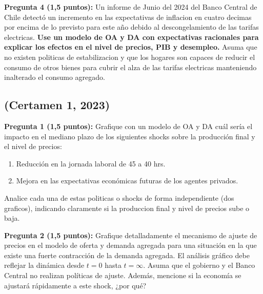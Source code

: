 \documentclass[11pt,addpoints]{article}
\begin{document}
\textbf{Pregunta 4 (1,5 puntos):}  
Un informe de Junio del 2024 del Banco Central de Chile detectó un incremento en las expectativas de inflacion en cuatro decimas por encima de lo previsto para este año debido al descongelamiento de las tarifas electricas. \textbf{Use un modelo de OA y DA con expectativas racionales para explicar los efectos en el nivel de precios, PIB y desempleo.}  Asuma que no existen politicas de estabilizacion y que los hogares son capaces de reducir el consumo de otros bienes para cubrir el alza de las tarifas electricas manteniendo inalterado el consumo agregado.



\subsection*{(Certamen 1, 2023)}
\textbf{Pregunta 1 (1,5 puntos):}  
Grafique con un modelo de OA y DA cuál sería el impacto en el mediano plazo de los siguientes shocks sobre la producción final y el nivel de precios:
\begin{enumerate}[label=\alph*)]
    \item Reducción en la jornada laboral de 45 a 40 hrs.  
    \item Mejora en las expectativas económicas futuras de los agentes privados.  
\end{enumerate}
\newpage
\vspace*{0.1cm}

Analice cada una de estas politicas o shocks de forma independiente (dos graficos), indicando claramente si la produccion final y nivel de precios sube o baja.

\vspace{0.3cm}

\textbf{Pregunta 2 (1,5 puntos):}  
Grafique detalladamente el mecanismo de ajuste de precios en el modelo de oferta y demanda agregada para una situación en la que existe una fuerte contracción de la demanda agregada. El análisis gráfico debe reflejar la dinámica desde $t=0$ hasta $t=\infty$. Asuma que el gobierno y el Banco Central no realizan políticas de ajuste. Además, mencione si la economía se ajustará rápidamente a este shock, ¿por qué?

\vspace{0.3cm}
\end{document}
